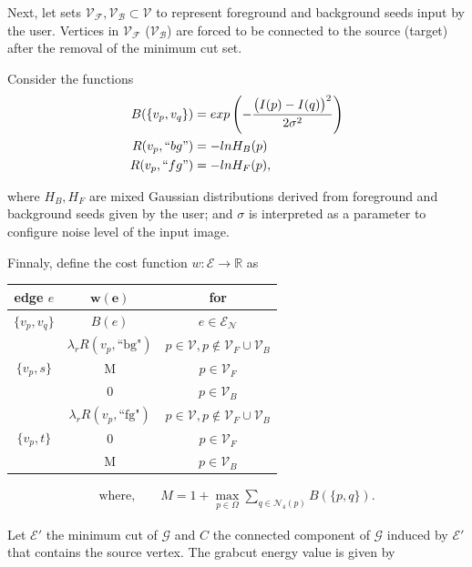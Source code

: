 Next, let sets $\mathcal{V_F}, \mathcal{V_B} \subset \mathcal{V}$ to represent foreground and background seeds input by the user. Vertices in $\mathcal{V_F}$ ($\mathcal{V_B}$) are forced to be connected to the source (target) after the removal of the minimum cut set.

Consider the functions
\begin{align*}
	B(\{v_p,v_q\}) &= exp \left( -\frac{ \big(I(p) - I(q)\big)^2}{2\sigma ^2} \right) \\
	R(v_p,``bg") &= -ln H_B(p)\\
	R(v_p,``fg") &= -ln H_F(p),
\end{align*}

where $H_B,H_F$ are mixed Gaussian distributions derived from  foreground and background seeds given by the user; and $\sigma$ is interpreted as a parameter to configure noise level of the input image.

Finnaly, define the cost function $w:\mathcal{E}\rightarrow \mathbb{R}$ as

\begin{table}[H]
\centering
\setlength{\extrarowheight}{0.75em}
\begin{tabular}{|c|c|c|}
\hline
\textbf{edge} $e$ & $\mathbf{w(e)}$ & \textbf{for}\\
\hline
$\{v_p, v_q\}$ & $B(e)$ & $e \in \mathcal{E}_{\mathcal{N}}$\\
\hline
\multirow{3}{*}{$\{v_p, s\}$} & $\lambda_r R(v_p,\text{``bg"})$ & $p \in \mathcal{\mathcal{V}}, p \notin \mathcal{\mathcal{V}}_F \cup \mathcal{\mathcal{V}}_B$\\
& M & $p \in \mathcal{\mathcal{V}}_F$ \\
& 0 & $p \in \mathcal{\mathcal{V}}_B$ \\
\hline
\multirow{3}{*}{$\{v_p, t\}$} & $\lambda_r R(v_p,\text{``fg"})$ & $p \in \mathcal{\mathcal{V}}, p \notin \mathcal{\mathcal{V}}_F \cup \mathcal{\mathcal{V}}_B$\\
& 0 & $p \in \mathcal{\mathcal{V}}_F$ \\
& M & $p \in \mathcal{\mathcal{V}}_B$ \\
\hline
\end{tabular}
\begin{align*}
\text{where,} \qquad M = 1 + \max_{p \in \Omega}{\sum_{q \in \mathcal{N}_4(p)}}{B(\{p,q\})}.
\end{align*}
\end{table}

Let $\mathcal{E}'$ the minimum cut of $\mathcal{G}$ and $C$ the connected component of $\mathcal{G}$ induced by $\mathcal{E}'$ that contains the source vertex. The grabcut energy value is given by

